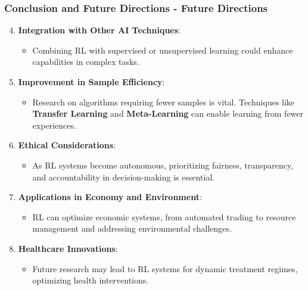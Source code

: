 \documentclass{beamer}
\begin{document}
\begin{frame}[fragile]
    \frametitle{Conclusion and Future Directions - Future Directions}
    \begin{enumerate}
        \setcounter{enumi}{3}
        \item \textbf{Integration with Other AI Techniques}:
        \begin{itemize}
            \item Combining RL with supervised or unsupervised learning could enhance capabilities in complex tasks.
        \end{itemize}

        \item \textbf{Improvement in Sample Efficiency}:
        \begin{itemize}
            \item Research on algorithms requiring fewer samples is vital. Techniques like \textbf{Transfer Learning} and \textbf{Meta-Learning} can enable learning from fewer experiences.
        \end{itemize}

        \item \textbf{Ethical Considerations}:
        \begin{itemize}
            \item As RL systems become autonomous, prioritizing fairness, transparency, and accountability in decision-making is essential.
        \end{itemize}

        \item \textbf{Applications in Economy and Environment}:
        \begin{itemize}
            \item RL can optimize economic systems, from automated trading to resource management and addressing environmental challenges.
        \end{itemize}

        \item \textbf{Healthcare Innovations}:
        \begin{itemize}
            \item Future research may lead to RL systems for dynamic treatment regimes, optimizing health interventions.
        \end{itemize}
    \end{enumerate}
\end{frame}
\end{document}
